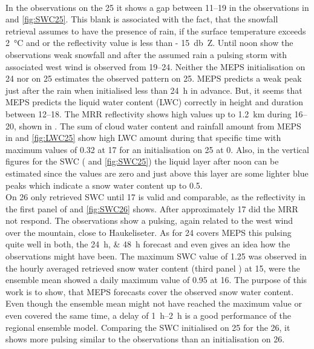 \\
In the observations on the \SI{25}{\dec} it shows a gap between \SIrange{11}{19}{\UTC} in the observations in  and \ref{fig:SWC25}. This blank is associated with the fact, that the snowfall retrieval assumes to have the presence of rain, if the surface temperature exceeds \SI{2}{\celsius} and or the reflectivity value is less than \SI{- 15}{\decibel Z}. Until noon show the observations weak snowfall and after the assumed rain a pulsing storm with associated west wind is observed from \SIrange{19}{24}{\UTC}. Neither the MEPS initialisation on \SI{24}{\dec} nor on \SI{25}{\dec} estimates the observed pattern on \SI{25}{\dec}. MEPS predicts a weak peak just after the rain when initialised less than \SI{24}{\hour} in advance. But, it seems that MEPS predicts the liquid water content (LWC) correctly in height and duration between \SIrange{12}{18}{\UTC}. The MRR reflectivity shows high values up to  \SI{1.2}{\kilo\metre} during \SIrange{16}{20}{\UTC}, shown in . The sum of cloud water content and rainfall amount from MEPS in  and \ref{fig:LWC25} show high LWC amount during that specific time with maximum values of \SI{0.32}{\SWC} at \SI{17}{\UTC} for an initialisation on \SI{25}{\dec} at \SI{0}{\UTC}. Also, in the vertical figures for the SWC ( and \ref{fig:SWC25}) the liquid layer after noon can be estimated since the values are zero and just above this layer are some lighter blue peaks which indicate a snow water content up to \SI{0.5}{\SWC}.
\\
On \SI{26}{\dec} only retrieved SWC until \SI{17}{\UTC} is valid and comparable, as the reflectivity in the first panel of  and \ref{fig:SWC26} shows. After approximately \SI{17}{\UTC} did the MRR not respond. 
The observations show a pulsing, again related to the west wind over the mountain, close to Haukeliseter. As for \SI{24}{\dec} covers MEPS this pulsing quite well in both, the \SIlist{24;48}{\hour} forecast and even gives an idea how the observations might have been. The maximum SWC value of \SI{1.25}{\SWC} was observed in the hourly averaged retrieved snow water content (third panel ) at \SI{15}{\UTC}, were the ensemble mean showed a daily maximum value of \SI{0.95}{\SWC} at \SI{16}{\UTC}. The purpose of this work is to show, that MEPS forecasts cover the observed snow water content. Even though the ensemble mean might not have reached the maximum value or even covered the same time, a delay of \SIrange{1}{2}{\hour} is a good performance of the regional ensemble model. Comparing the SWC initialised on \SI{25}{\dec} for the \SI{26}{\dec}, it shows more pulsing similar to the observations than an initialisation on \SI{26}{\dec}.
